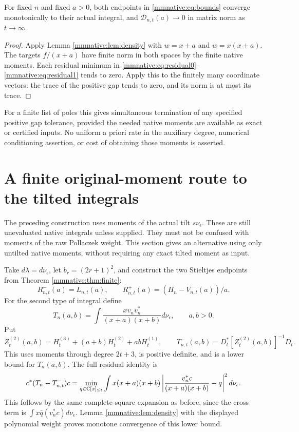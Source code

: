 \begin{mmnativeproposition}\label{mmnative:prop:converge}
For fixed $n$ and fixed $a>0$, both endpoints in \eqref{mmnative:eq:bounds}
converge monotonically to their actual integral, and
$\mathcal D_{n,t}(a)\to0$ in matrix norm as $t\to\infty$.
\end{mmnativeproposition}
\begin{proof}
Apply Lemma \ref{mmnative:lem:density} with $w=x+a$ and $w=x(x+a)$.
The targets $f/(x+a)$ have finite norm in both spaces by the finite
native moments.  Each residual minimum in
\eqref{mmnative:eq:residual0}--\eqref{mmnative:eq:residual1} tends to zero.  Apply this
to the finitely many coordinate vectors: the trace of the positive
gap tends to zero, and its norm is at most its trace.
\end{proof}
For a finite list of poles this gives simultaneous termination of any
specified positive gap tolerance, provided the needed native moments
are available as exact or certified inputs.  No uniform a priori rate
in the auxiliary degree, numerical conditioning assertion, or cost of
obtaining those moments is asserted.

\section{A finite original-moment route to the tilted integrals}

The preceding construction uses moments of the actual tilt
$s\nu_\epsilon$.  These are still unevaluated native integrals unless
supplied.  They must not be confused with moments of the raw Pollaczek
weight.  This section gives an alternative using only untilted native
moments, without requiring any exact tilted moment as input.

Take $d\lambda=d\nu_\epsilon$, let $b_r=(2r+1)^2$, and construct
the two Stieltjes endpoints from Theorem \ref{mmnative:thm:finite}:
\[
 R_{n,t}^-(a)=L_{n,t}(a),\qquad
 R_{n,t}^+(a)=(H_n-V_{n,t}(a))/a.
\]
For the second type of integral define
\[
 T_n(a,b)=\int\frac{xv_nv_n^*}{(x+a)(x+b)}d\nu_\epsilon,
 \qquad a,b>0.
\]
Put
\begin{equation}\label{mmnative:eq:quadraticlower}
 Z_t^{(2)}(a,b)=H_t^{(3)}+(a+b)H_t^{(2)}+abH_t^{(1)},
 \qquad T_{n,t}^-(a,b)=D_t^*[Z_t^{(2)}(a,b)]^{-1}D_t.
\end{equation}
This uses moments through degree $2t+3$, is positive definite, and
is a lower bound for $T_n(a,b)$.  The full residual identity is
\begin{equation}\label{mmnative:eq:quadres}
 c^*(T_n-T_{n,t}^-)c
 =\min_{q\in\mathbb C[x]_{\le t}}
 \int x(x+a)(x+b)
 \left|\frac{v_n^*c}{(x+a)(x+b)}-q\right|^2d\nu_\epsilon.
\end{equation}
This follows by the same complete-square expansion as before, since
the cross term is $\int x\bar q(v_n^*c)d\nu_\epsilon$.
Lemma \ref{mmnative:lem:density} with the displayed polynomial weight proves
monotone convergence of this lower bound.

